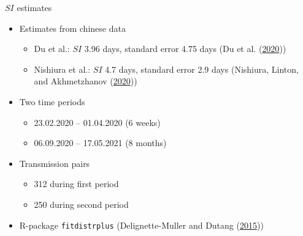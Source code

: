 \documentclass[
  ignorenonframetext,
  aspectratio=169,
]{beamer}
\providecommand{\tightlist}{%
  \setlength{\itemsep}{0pt}\setlength{\parskip}{0pt}}
\newcommand{\R}{\textsf{R}}
\begin{document}
\begin{frame}{\(SI\) estimates}
\protect\hypertarget{si-estimates}{}
\begin{itemize}
\tightlist
\item
  Estimates from chinese data

  \begin{itemize}
  \tightlist
  \item
    Du et al.: \(SI\) 3.96 days, standard error 4.75 days (Du et al.
    (\protect\hyperlink{ref-du2020}{2020}))
  \item
    Nishiura et al.: \(SI\) 4.7 days, standard error 2.9 days (Nishiura,
    Linton, and Akhmetzhanov
    (\protect\hyperlink{ref-nishiura2020}{2020}))
  \end{itemize}
\item
  Two time periods

  \begin{itemize}
  \tightlist
  \item
    23.02.2020 -- 01.04.2020 (6 weeks)
  \item
    06.09.2020 -- 17.05.2021 (8 months)
  \end{itemize}
\item
  Transmission pairs

  \begin{itemize}
  \tightlist
  \item
    312 during first period
  \item
    250 during second period
  \end{itemize}
\item
  \R{}-package \texttt{fitdistrplus} (Delignette-Muller and Dutang
  (\protect\hyperlink{ref-delignette-muller2015}{2015}))
\end{itemize}
\end{frame}
\end{document}

